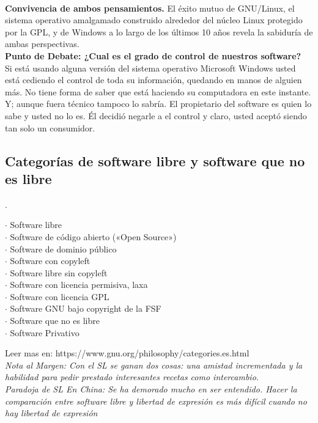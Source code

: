 \documentclass{book}
\begin{document}
\\
{\bf Convivencia de ambos pensamientos.}
El éxito mutuo de GNU/Linux, el sistema operativo amalgamado construido alrededor del núcleo
Linux protegido por la GPL, y de Windows a lo largo de los últimos 10 años revela la sabiduría de
ambas perspectivas.
\\
{\bf Punto de Debate: ¿Cual es el grado de control de nuestros software?}
\\
Si está usando alguna versión del sistema operativo Microsoft Windows usted está cediendo el control de toda su información, quedando en manos de alguien más. No tiene forma de saber que está haciendo su computadora en este instante.
\\
Y; aunque fuera  técnico tampoco lo sabría. El propietario del software es quien lo sabe y usted no lo es. 
Él decidió negarle a el control y claro, usted aceptó siendo tan solo un consumidor.

\subsection{Categorías de software libre y software que no es libre}
	.
\begin{description}
	\item[$\cdot$ Software libre]
	\item[$\cdot$ Software de código abierto («Open Source»)]
	\item[$\cdot$ Software de dominio público]
	\item[$\cdot$ Software con copyleft]
	\item[$\cdot$ Software libre sin copyleft]
	\item[$\cdot$ Software con licencia permisiva, laxa]
	\item[$\cdot$ Software con licencia GPL]
	\item[$\cdot$ Software GNU bajo copyright de la FSF]
	\item[$\cdot$ Software que no es libre]
	\item[$\cdot$ Software Privativo]
\end{description}

Leer mas en: https://www.gnu.org/philosophy/categories.es.html
\\
{\it
\emph{Nota al Margen:} Con el SL se ganan dos cosas: una amistad incrementada y la habilidad para pedir prestado interesantes recetas como intercambio.
\\
\emph{Paradoja de SL En China:}
Se ha demorado mucho en ser entendido. Hacer la comparación entre software libre y libertad de expresión es más difícil cuando no hay libertad de expresión
}
\end{document}
